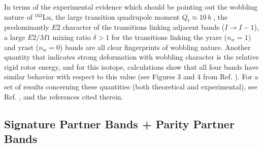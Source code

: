 \documentclass[myclassdoc,debug]{rjparticle}
\begin{document}
In terms of the experimental evidence which should be pointing out the wobbling nature of $^{163}$Lu, the large transition quadrupole moment $Q_t \approx 10\ b$ \cite{gorgen2004quadrupole}, the predominantly $E2$ character of the transitions linking adjacent bands ($I\to I-1$), a large $E2/M1$ mixing ratio $\delta>1$ for the transitions linking the yrare ($n_w=1$) and yrast ($n_w=0$) bands are all clear fingerprints of wobbling nature. Another quantity that indicates strong deformation with wobbling character is the relative rigid rotor energy, and for this isotope, calculations show that all four bands have similar behavior with respect to this value (see Figures 3 and 4 from Ref. \cite{hagemann2005triaxiality}). For a set of results concerning these quantities (both theoretical and experimental), see Ref. \cite{raduta2017semiclassical}, and the references cited therein. 

\subsection{Signature Partner Bands + Parity Partner Bands}
\label{subsection:w2}
\end{document}
